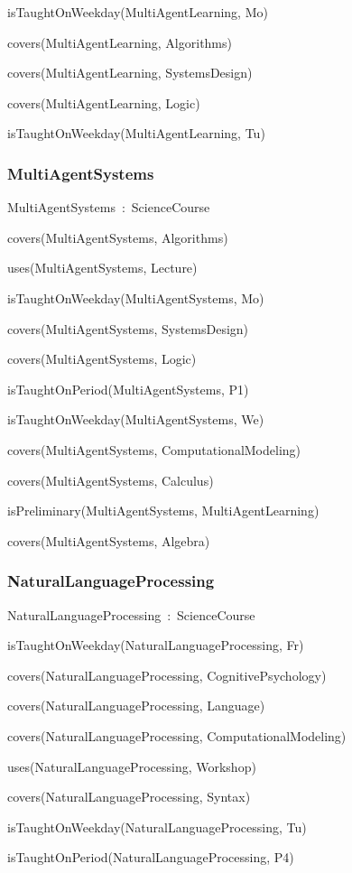 \documentclass{article}
\begin{document}
isTaughtOnWeekday(MultiAgentLearning, Mo)

covers(MultiAgentLearning, Algorithms)

covers(MultiAgentLearning, SystemsDesign)

covers(MultiAgentLearning, Logic)

isTaughtOnWeekday(MultiAgentLearning, Tu)

\subsubsection*{MultiAgentSystems}

MultiAgentSystems~:~ScienceCourse

covers(MultiAgentSystems, Algorithms)

uses(MultiAgentSystems, Lecture)

isTaughtOnWeekday(MultiAgentSystems, Mo)

covers(MultiAgentSystems, SystemsDesign)

covers(MultiAgentSystems, Logic)

isTaughtOnPeriod(MultiAgentSystems, P1)

isTaughtOnWeekday(MultiAgentSystems, We)

covers(MultiAgentSystems, ComputationalModeling)

covers(MultiAgentSystems, Calculus)

isPreliminary(MultiAgentSystems, MultiAgentLearning)

covers(MultiAgentSystems, Algebra)

\subsubsection*{NaturalLanguageProcessing}

NaturalLanguageProcessing~:~ScienceCourse

isTaughtOnWeekday(NaturalLanguageProcessing, Fr)

covers(NaturalLanguageProcessing, CognitivePsychology)

covers(NaturalLanguageProcessing, Language)

covers(NaturalLanguageProcessing, ComputationalModeling)

uses(NaturalLanguageProcessing, Workshop)

covers(NaturalLanguageProcessing, Syntax)

isTaughtOnWeekday(NaturalLanguageProcessing, Tu)

isTaughtOnPeriod(NaturalLanguageProcessing, P4)
\end{document}
